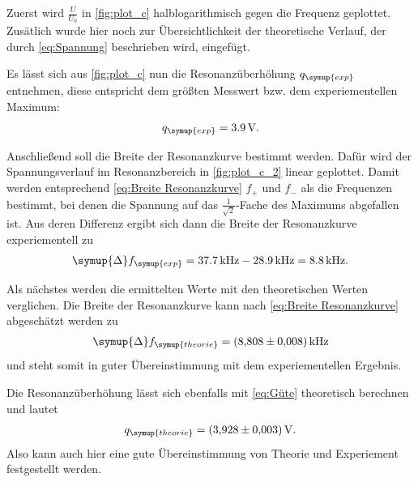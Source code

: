 Zuerst wird $\frac{U}{U_{0}}$ in \autoref{fig:plot_c} halblogarithmisch gegen die Frequenz geplottet.
Zusätlich wurde hier noch zur Übersichtlichkeit der theoretische Verlauf, der durch \autoref{eq:Spannung} beschrieben wird, eingefügt.

Es lässt sich aus \autoref{fig:plot_c} nun die Resonanzüberhöhung $q_{\symup{exp}}$ entnehmen, diese entspricht dem größten Messwert bzw.
dem experiementellen Maximum:
\begin{gather*}
  q_{\symup{exp}} = 3.9\,\unit{\volt}. \notag
\end{gather*}

Anschließend soll die Breite der Resonanzkurve bestimmt werden.
Dafür wird der Spannungsverlauf im Resonanzbereich in \autoref{fig:plot_c_2} linear geplottet.
Damit werden entsprechend \eqref{eq:Breite Resonanzkurve} $f_+$ und $f_-$ als die Frequenzen bestimmt, bei denen
die Spannung auf das  $\frac{1}{\sqrt{2}}$-Fache des Maximums abgefallen ist.
Aus deren Differenz ergibt sich dann die Breite der Resonanzkurve experiementell zu
\begin{gather*}
  \symup{\Delta}f_{\symup{exp}} = 37.7\,\unit{\kilo\hertz} - 28.9\,\unit{\kilo\hertz} = 8.8\,\unit{\kilo\hertz}. \notag
\end{gather*}

Als nächstes werden die ermittelten Werte mit den theoretischen Werten verglichen.
Die Breite der Resonanzkurve kann nach \eqref{eq:Breite Resonanzkurve} abgeschätzt werden zu
\begin{gather*}
  \symup{\Delta}f_{\symup{theorie}} = \qty{8.808+-0.008}{\kilo\hertz} \notag
\end{gather*}
und steht somit in guter Übereinstimmung mit dem experiementellen Ergebnis.

Die Resonanzüberhöhung lässt sich ebenfalls mit \eqref{eq:Güte} theoretisch berechnen und lautet
\begin{gather*}
  q_{\symup{theorie}} = \qty{3.928+-0.003}{\volt}. \notag
\end{gather*}
Also kann auch hier eine gute Übereinstimmung von Theorie und Experiement festgestellt werden.


